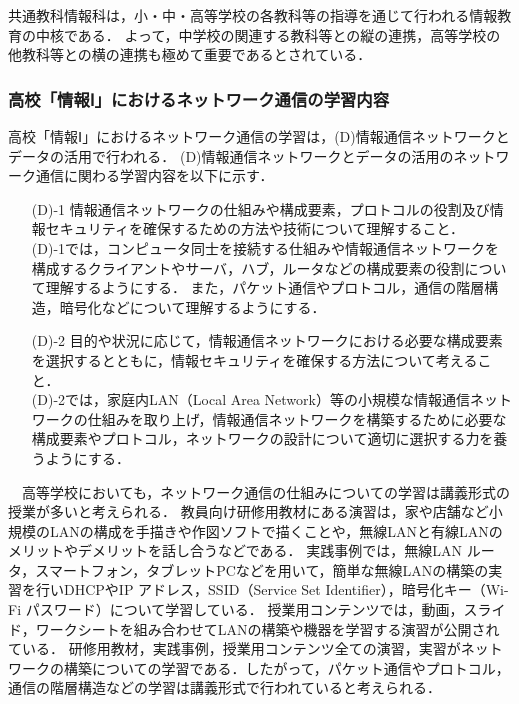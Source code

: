 \documentclass[12pt,a4j,titlepage]{ltjsarticle}
\begin{document}
共通教科情報科は，小・中・高等学校の各教科等の指導を通じて行われる情報教育の中核である．
よって，中学校の関連する教科等との縦の連携，高等学校の他教科等との横の連携も極めて重要であるとされている．
\clearpage
\subsubsection{高校「情報Ⅰ」におけるネットワーク通信の学習内容}
高校「情報Ⅰ」におけるネットワーク通信の学習は，(D)情報通信ネットワークとデータの活用で行われる．
(D)情報通信ネットワークとデータの活用のネットワーク通信に関わる学習内容を以下に示す．
\begin{enumerate}

\item[(D)-1] 情報通信ネットワークの仕組みや構成要素，プロトコルの役割及び情報セキュリティを確保するための方法や技術について理解すること．
\mbox{}\\
(D)-1では，コンピュータ同士を接続する仕組みや情報通信ネットワークを構成するクライアントやサーバ，ハブ，ルータなどの構成要素の役割について理解するようにする．
また，パケット通信やプロトコル，通信の階層構造，暗号化などについて理解するようにする．\\
 
\item[(D)-2] 目的や状況に応じて，情報通信ネットワークにおける必要な構成要素を選択するとともに，情報セキュリティを確保する方法について考えること．
\mbox{}\\
(D)-2では，家庭内LAN（Local Area Network）等の小規模な情報通信ネットワークの仕組みを取り上げ，情報通信ネットワークを構築するために必要な構成要素やプロトコル，ネットワークの設計について適切に選択する力を養うようにする．
\end{enumerate}
　高等学校においても，ネットワーク通信の仕組みについての学習は講義形式の授業が多いと考えられる．
教員向け研修用教材にある演習は\cite{koukou_kensyu}，家や店舗など小規模のLANの構成を手描きや作図ソフトで描くことや，無線LANと有線LANのメリットやデメリットを話し合うなどである．
実践事例では\cite{koukou_jirei}，無線LAN ルータ，スマートフォン，タブレットPCなどを用いて，簡単な無線LANの構築の実習を行いDHCPやIP アドレス，SSID（Service Set Identifier），暗号化キー（Wi-Fi パスワード）について学習している．
授業用コンテンツでは\cite{koukou_kon}，動画，スライド，ワークシートを組み合わせてLANの構築や機器を学習する演習が公開されている．
研修用教材，実践事例，授業用コンテンツ全ての演習，実習がネットワークの構築についての学習である．したがって，パケット通信やプロトコル，通信の階層構造などの学習は講義形式で行われていると考えられる．
\clearpage
\end{document}
